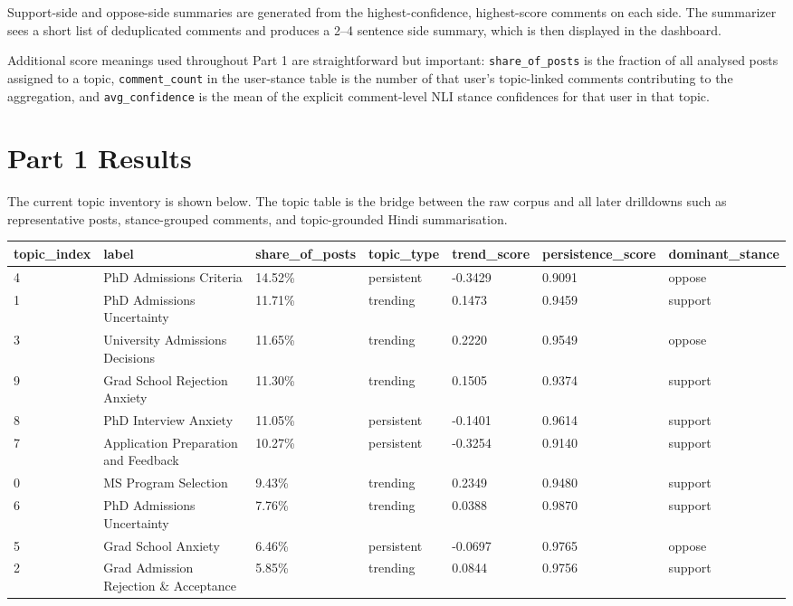 \documentclass[11pt]{article}
\begin{document}
        Support-side and oppose-side summaries are generated from the highest-confidence, highest-score comments on each side. The summarizer sees a short list of deduplicated comments and produces a 2--4 sentence side summary, which is then displayed in the dashboard.

        Additional score meanings used throughout Part 1 are straightforward but important: \texttt{share\_of\_posts} is the fraction of all analysed posts assigned to a topic, \texttt{comment\_count} in the user-stance table is the number of that user's topic-linked comments contributing to the aggregation, and \texttt{avg\_confidence} is the mean of the explicit comment-level NLI stance confidences for that user in that topic.

        \section*{Part 1 Results}
        The current topic inventory is shown below. The topic table is the bridge between the raw corpus and all later drilldowns such as representative posts, stance-grouped comments, and topic-grounded Hindi summarisation.

        \begin{center}
\small\begin{tabular}{p{}|p{}|p{}|p{}|p{}|p{}|p{}}
\hline
topic\_index & label & share\_of\_posts & topic\_type & trend\_score & persistence\_score & dominant\_stance \\ \hline
4 & PhD Admissions Criteria & 14.52\% & persistent & -0.3429 & 0.9091 & oppose \\ \hline
1 & PhD Admissions Uncertainty & 11.71\% & trending & 0.1473 & 0.9459 & support \\ \hline
3 & University Admissions Decisions & 11.65\% & trending & 0.2220 & 0.9549 & oppose \\ \hline
9 & Grad School Rejection Anxiety & 11.30\% & trending & 0.1505 & 0.9374 & support \\ \hline
8 & PhD Interview Anxiety & 11.05\% & persistent & -0.1401 & 0.9614 & support \\ \hline
7 & Application Preparation and Feedback & 10.27\% & persistent & -0.3254 & 0.9140 & support \\ \hline
0 & MS Program Selection & 9.43\% & trending & 0.2349 & 0.9480 & support \\ \hline
6 & PhD Admissions Uncertainty & 7.76\% & trending & 0.0388 & 0.9870 & support \\ \hline
5 & Grad School Anxiety & 6.46\% & persistent & -0.0697 & 0.9765 & oppose \\ \hline
2 & Grad Admission Rejection \& Acceptance & 5.85\% & trending & 0.0844 & 0.9756 & support \\ \hline
\end{tabular}
\end{center}
\end{document}
